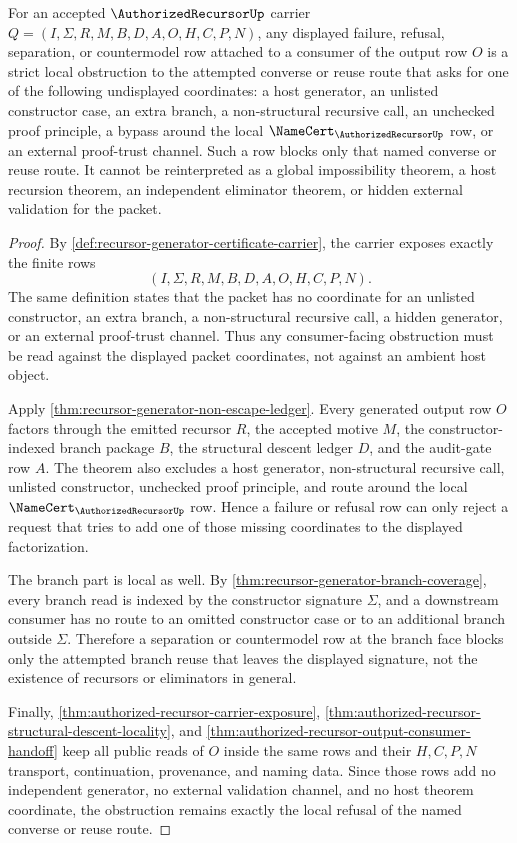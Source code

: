 \begin{corollary}
\label{cor:authorized-recursor-certificate-strict-obstruction}
For an accepted $\AuthorizedRecursorUp$ carrier $Q=(I,\Sigma,R,M,B,D,A,O,H,C,P,N)$, any displayed failure, refusal, separation, or countermodel row attached to a consumer of the output row $O$ is a strict local obstruction to the attempted converse or reuse route that asks for one of the following undisplayed coordinates: a host generator, an unlisted constructor case, an extra branch, a non-structural recursive call, an unchecked proof principle, a bypass around the local $\NameCert_{\AuthorizedRecursorUp}$ row, or an external proof-trust channel. Such a row blocks only that named converse or reuse route. It cannot be reinterpreted as a global impossibility theorem, a host recursion theorem, an independent eliminator theorem, or hidden external validation for the packet.
\end{corollary}
\begin{proof}
By \autoref{def:recursor-generator-certificate-carrier}, the carrier exposes exactly the finite rows
$$
(I,\Sigma,R,M,B,D,A,O,H,C,P,N).
$$
The same definition states that the packet has no coordinate for an unlisted constructor, an extra branch, a non-structural recursive call, a hidden generator, or an external proof-trust channel. Thus any consumer-facing obstruction must be read against the displayed packet coordinates, not against an ambient host object.

Apply \autoref{thm:recursor-generator-non-escape-ledger}. Every generated output row $O$ factors through the emitted recursor $R$, the accepted motive $M$, the constructor-indexed branch package $B$, the structural descent ledger $D$, and the audit-gate row $A$. The theorem also excludes a host generator, non-structural recursive call, unlisted constructor, unchecked proof principle, and route around the local $\NameCert_{\AuthorizedRecursorUp}$ row. Hence a failure or refusal row can only reject a request that tries to add one of those missing coordinates to the displayed factorization.

The branch part is local as well. By \autoref{thm:recursor-generator-branch-coverage}, every branch read is indexed by the constructor signature $\Sigma$, and a downstream consumer has no route to an omitted constructor case or to an additional branch outside $\Sigma$. Therefore a separation or countermodel row at the branch face blocks only the attempted branch reuse that leaves the displayed signature, not the existence of recursors or eliminators in general.

Finally, \autoref{thm:authorized-recursor-carrier-exposure}, \autoref{thm:authorized-recursor-structural-descent-locality}, and \autoref{thm:authorized-recursor-output-consumer-handoff} keep all public reads of $O$ inside the same rows and their $H,C,P,N$ transport, continuation, provenance, and naming data. Since those rows add no independent generator, no external validation channel, and no host theorem coordinate, the obstruction remains exactly the local refusal of the named converse or reuse route.
\end{proof}
